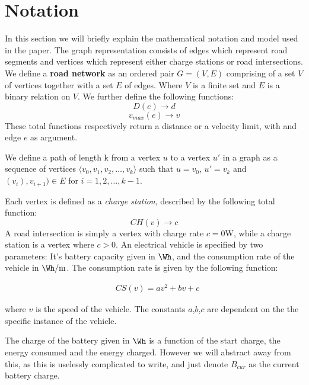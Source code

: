 \section{Notation}
In this section we will briefly explain the mathematical notation and model used in the paper. The graph representation consists of edges which represent road segments and vertices which represent either charge stations or road intersections. We define a \textbf{road network} as an ordered pair \(G=(V,E)\) comprising of a set $V$ of vertices together with a set $E$ of edges. Where $V$ is a finite set and $E$ is a binary relation on $V$. We further define the following functions:
\[ D(e)\rightarrow d \] 
\[ v_{max}(e)\rightarrow v \] 
These total functions respectively return a distance or a velocity limit, with and edge $e$ as argument.

We define a path of length k from a vertex $u$ to a vertex $u'$ in a graph as a sequence of vertices $\langle v_0,v_1,v_2,\dots,v_k \rangle$ such that $u=v_0$, $u'=v_k$ and $(v_{i}),v_{i+1})\in E$ for $i=1,2,\dots ,k-1$.

Each vertex is defined as a \textit{charge station}, described by the following total function:
\[CH(v)\rightarrow c\]
A road intersection is simply a vertex with charge rate $c = 0\si{\W}$, while a charge station is a vertex where $c > 0$. An electrical vehicle is specified by two parameters: It's battery capacity given in $\si{\Wh}$, and the consumption rate of the vehicle in $\si{\Wh\per\metre}$. The consumption rate is given by the following function:

\begin{equation}
\begin{aligned}
 & CS(v)=av^2+bv+c
\end{aligned}
\end{equation}\label{eq:chargingFunc}


where $v$ is the speed of the vehicle. The constants $a$,$b$,$c$ are dependent on the the specific instance of the vehicle.

The charge of the battery given in $\si{\Wh}$ is a function of the start charge, the energy consumed and the energy charged. However we will abstract away from this, as this is uselessly complicated to write, and just denote $B_{cur}$ as the current battery charge.

